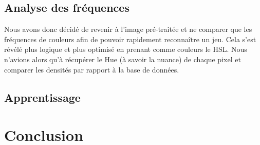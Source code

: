 \documentclass{st50_template}
\begin{document}
\subsection{Analyse des fréquences}

Nous avons donc décidé de revenir à l'image pré-traitée et ne comparer que les fréquences de couleurs afin de pouvoir rapidement reconnaître un jeu. Cela s'est révélé plus logique et plus optimisé en prenant comme couleurs le HSL. Nous n'avions alors qu'à récupérer le Hue (à savoir la nuance) de chaque pixel et comparer les densités par rapport à la base de données.

\subsection{Apprentissage}

\section{Conclusion}
\end{document}
